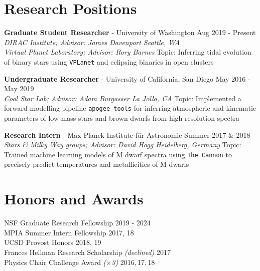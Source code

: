 \documentclass[margin,line]{resume}
\begin{document}
\begin{resume}

\section{\mysidestyle \textcolor{bcolor}{Research Positions}}

\textbf{Graduate Student Researcher} - University of Washington \hfill Aug 2019 - Present \\
\textsl{DIRAC Institute; Advisor: James Davenport \hfill Seattle, WA} \\
\textsl{Virtual Planet Laboratory; Advisor: Rory Barnes} 
\vspace{.1cm} \newline
Topic: Inferring tidal evolution of binary stars using \texttt{VPLanet} and eclipsing binaries in open clusters

\textbf{Undergraduate Researcher} - University of California, San Diego \hfill May 2016 - May 2019  \\
\textsl{Cool Star Lab; Advisor: Adam Burgasser \hfill La Jolla, CA} 
\vspace{.1cm} \newline
Topic: Implemented a forward modelling pipeline \texttt{apogee\_tools} for inferring atmospheric and kinematic parameters of low-mass stars and brown dwarfs from high resolution spectra

\textbf{Research Intern} - Max Planck Institute f{\"u}r Astronomie \hfill Summer 2017 \& 2018 \\
\textsl{Stars \& Milky Way groups; Advisor: David Hogg \hfill Heidelberg, Germany} 
\vspace{.1cm} \newline
Topic: Trained machine learning models of M dwarf spectra using \texttt{The Cannon} to precisely predict temperatures and metallicities of M dwarfs


\section{\mysidestyle \textcolor{bcolor}{Honors and Awards}}
NSF Graduate Research Fellowship \hfill 2019 - 2024 \\
MPIA Summer Intern Fellowship \hfill 2017, 18 \\
UCSD Provost Honors \hfill 2018, 19 \\
Frances Hellman Research Scholarship \textit{(declined)} \hfill 2017 \\
Physics Chair Challenge Award \textit{($\times$3)} \hfill 2016,\,17,\,18 



\end{resume}
\end{document}
